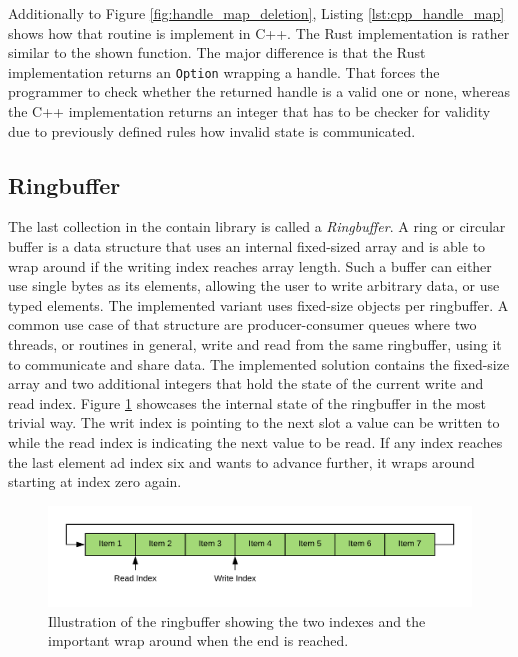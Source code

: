\noindent
Additionally to Figure \ref{fig:handle_map_deletion}, Listing \ref{lst:cpp_handle_map} shows how that routine is implement in C++. The Rust implementation is rather similar to the shown function. The major difference is that the Rust implementation returns an \texttt{Option} wrapping a handle. That forces the programmer to check whether the returned handle is a valid one or none, whereas the C++ implementation returns an integer that has to be checker for validity due to previously defined rules how invalid state is communicated.

\subsection{Ringbuffer}

The last collection in the contain library is called a \textit{Ringbuffer}. A ring or circular buffer is a data structure that uses an internal fixed-sized array and is able to wrap around if the writing index reaches array length. Such a buffer can either use single bytes as its elements, allowing the user to write arbitrary data, or use typed elements. The implemented variant uses fixed-size objects per ringbuffer. A common use case of that structure are producer-consumer queues where two threads, or routines in general, write and read from the same ringbuffer, using it to communicate and share data. The implemented solution contains the fixed-size array and two additional integers that hold the state of the current write and read index. Figure \ref{fig:ringbuffer} showcases the internal state of the ringbuffer in the most trivial way. The writ index is pointing to the next slot a value can be written to while the read index is indicating the next value to be read. If any index reaches the last element ad index six and wants to advance further, it wraps around starting at index zero again.

\begin{figure}[h!]
	\centering \includegraphics[width=\linewidth]{PICs/ringbuffer.png}
	\caption{Illustration of the ringbuffer showing the two indexes and the important wrap around when the end is reached.}
	\label{fig:ringbuffer}
\end{figure}


